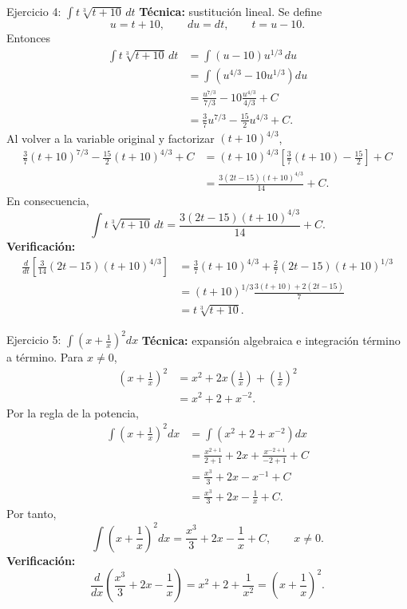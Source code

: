 \begin{activitybox}{Ejercicio 4: $\displaystyle \int t\sqrt[3]{t+10}\,dt$}
\textbf{Técnica:} sustitución lineal. Se define
\[
 u=t+10,\qquad du=dt,\qquad t=u-10.
\]
Entonces
\begin{align*}
 \int t\sqrt[3]{t+10}\,dt
 &=\int(u-10)u^{1/3}\,du\\
 &=\int\left(u^{4/3}-10u^{1/3}\right)du\\
 &=\frac{u^{7/3}}{7/3}-10\frac{u^{4/3}}{4/3}+C\\
 &=\frac37u^{7/3}-\frac{15}{2}u^{4/3}+C.
\end{align*}
Al volver a la variable original y factorizar $(t+10)^{4/3}$,
\begin{align*}
 \frac37(t+10)^{7/3}-\frac{15}{2}(t+10)^{4/3}+C
 &=(t+10)^{4/3}\left[\frac37(t+10)-\frac{15}{2}\right]+C\\
 &=\frac{3(2t-15)(t+10)^{4/3}}{14}+C.
\end{align*}
En consecuencia,
\[
 \boxed{\int t\sqrt[3]{t+10}\,dt
 =\frac{3(2t-15)(t+10)^{4/3}}{14}+C}.
\]
\textbf{Verificación:}
\begin{align*}
 \frac{d}{dt}\left[\frac{3}{14}(2t-15)(t+10)^{4/3}\right]
 &=\frac37(t+10)^{4/3}+\frac27(2t-15)(t+10)^{1/3}\\
 &=(t+10)^{1/3}\frac{3(t+10)+2(2t-15)}7\\
 &=t\sqrt[3]{t+10}.
\end{align*}
\end{activitybox}

\begin{activitybox}{Ejercicio 5: $\displaystyle \int\left(x+\frac1x\right)^2dx$}
\textbf{Técnica:} expansión algebraica e integración término a término. Para $x\neq0$,
\begin{align*}
 \left(x+\frac1x\right)^2
 &=x^2+2x\left(\frac1x\right)+\left(\frac1x\right)^2\\
 &=x^2+2+x^{-2}.
\end{align*}
Por la regla de la potencia,
\begin{align*}
 \int\left(x+\frac1x\right)^2dx
 &=\int\left(x^2+2+x^{-2}\right)dx\\
 &=\frac{x^{2+1}}{2+1}+2x+\frac{x^{-2+1}}{-2+1}+C\\
 &=\frac{x^3}{3}+2x-x^{-1}+C\\
 &=\frac{x^3}{3}+2x-\frac1x+C.
\end{align*}
Por tanto,
\[
 \boxed{\int\left(x+\frac1x\right)^2dx
 =\frac{x^3}{3}+2x-\frac1x+C},\qquad x\neq0.
\]
\textbf{Verificación:}
\[
 \frac{d}{dx}\left(\frac{x^3}{3}+2x-\frac1x\right)
 =x^2+2+\frac1{x^2}
 =\left(x+\frac1x\right)^2.
\]
\end{activitybox}


